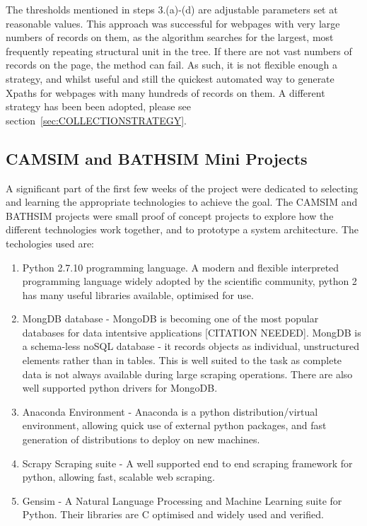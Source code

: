 \documentclass[11pt, oneside]{article}   	%
\begin{document}
The thresholds mentioned in steps 3.(a)-(d) are adjustable parameters set at reasonable values. This approach was successful for webpages with very large numbers of records on them, as the algorithm searches for the largest, most frequently repeating structural unit in the tree. If there are not vast numbers of records on the page, the method can fail.
As such, it is not flexible enough a strategy, and whilst useful and still the quickest automated way to generate Xpaths for webpages with many hundreds of records on them. A different strategy has been been adopted, please see section~\ref{sec:COLLECTIONSTRATEGY}.
\subsection{CAMSIM and BATHSIM Mini Projects}
A significant part of the first few weeks of the project were dedicated to selecting and learning the appropriate technologies to achieve the goal. The CAMSIM and BATHSIM projects were small proof of concept projects to explore how the different technologies work together, and to prototype a system architecture.
The techologies used are:
\begin{enumerate}
\item Python 2.7.10 programming language. A modern and flexible interpreted programming language widely adopted by the scientific community, python 2 has many useful libraries available, optimised for use.
\item MongDB database - MongoDB is becoming one of the most popular databases for data intentsive applications [CITATION NEEDED]. MongDB is a schema-less noSQL database - it records objects as individual, unstructured elements rather than in tables. This is well suited to the task as complete data is not always available during large scraping operations. There are also well supported python drivers for MongoDB. 
\item Anaconda Environment - Anaconda is a python distribution/virtual environment, allowing quick use of external python packages, and fast generation of distributions to deploy on new machines.
\item Scrapy Scraping suite - A well supported end to end scraping framework for python, allowing fast, scalable web scraping. 
\item Gensim - A Natural Language Processing and Machine Learning suite for Python. Their libraries are C optimised and widely used and verified.
\end{enumerate}
\end{document}
